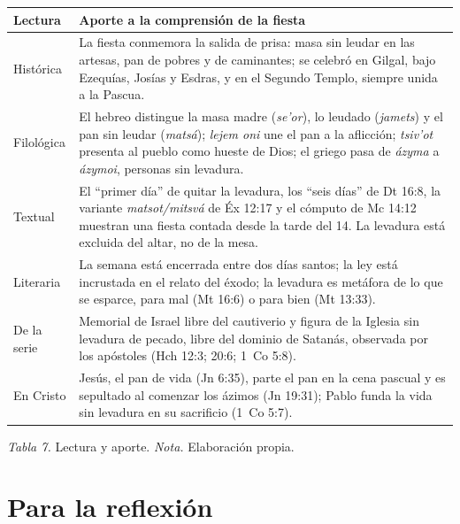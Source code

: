 \documentclass[11pt,letterpaper]{article}
\begin{document}
\begin{center}\begin{minipage}{\linewidth}\centering\small\renewcommand{\arraystretch}{1.25}
\begin{tabular}{@{}L{3cm}L{12.6cm}@{}}
\toprule
\textbf{Lectura} & \textbf{Aporte a la comprensión de la fiesta} \\ \midrule
Histórica & La fiesta conmemora la salida de prisa: masa sin leudar en las artesas, pan de pobres y de caminantes; se celebró en Gilgal, bajo Ezequías, Josías y Esdras, y en el Segundo Templo, siempre unida a la Pascua. \\
Filológica & El hebreo distingue la masa madre (\emph{se'or}), lo leudado (\emph{jamets}) y el pan sin leudar (\emph{matsá}); \emph{lejem oni} une el pan a la aflicción; \emph{tsiv'ot} presenta al pueblo como hueste de Dios; el griego pasa de \emph{ázyma} a \emph{ázymoi}, personas sin levadura. \\
Textual & El ``primer día'' de quitar la levadura, los ``seis días'' de Dt 16:8, la variante \emph{matsot/mitsvá} de Éx 12:17 y el cómputo de Mc 14:12 muestran una fiesta contada desde la tarde del 14. La levadura está excluida del altar, no de la mesa. \\
Literaria & La semana está encerrada entre dos días santos; la ley está incrustada en el relato del éxodo; la levadura es metáfora de lo que se esparce, para mal (Mt 16:6) o para bien (Mt 13:33). \\
De la serie & Memorial de Israel libre del cautiverio y figura de la Iglesia sin levadura de pecado, libre del dominio de Satanás, observada por los apóstoles (Hch 12:3; 20:6; 1~Co 5:8). \\
En Cristo & Jesús, el pan de vida (Jn 6:35), parte el pan en la cena pascual y es sepultado al comenzar los ázimos (Jn 19:31); Pablo funda la vida sin levadura en su sacrificio (1~Co 5:7). \\
\bottomrule
\end{tabular}\par\nopagebreak
{\footnotesize\color{sepia}\textit{Tabla 7.} Lectura y aporte. \textit{Nota.} Elaboración propia.}
\end{minipage}\end{center}

\section{Para la reflexión}
\end{document}

